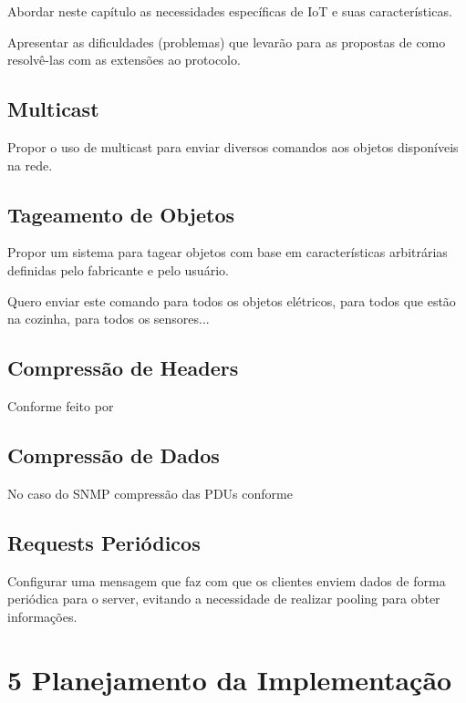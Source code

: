 \documentclass[twoside,english,brazilian]{UNISINOSmonografia}
\begin{document}
	Abordar neste capítulo as necessidades específicas de IoT e suas 
	características.
	
	Apresentar as dificuldades (problemas) que levarão para as propostas
	de como resolvê-las com as extensões ao protocolo.
	
	
	\section{Multicast}
		
		Propor o uso de multicast para enviar diversos comandos aos objetos
		disponíveis na rede.
		
		
	\section{Tageamento de Objetos}
		
		Propor um sistema para tagear objetos com base em características
		arbitrárias definidas pelo fabricante e pelo usuário.
		
		Quero enviar este comando para todos os objetos elétricos, para
		todos que estão na cozinha, para todos os sensores...
		
		
	\section{Compressão de Headers}
		
		Conforme feito por \cite{Choi2009}
		
		
	\section{Compressão de Dados}
		
		No caso do SNMP compressão das PDUs conforme \cite{Choi2009}
		
		
	\section{Requests Periódicos}
		
		Configurar uma mensagem que faz com que os clientes enviem
		dados de forma periódica para o server, evitando a necessidade
		de realizar pooling para obter informações.
		\cite{Choi2009}
		
		
\chapter{5 Planejamento da Implementação}
	
\end{document}
